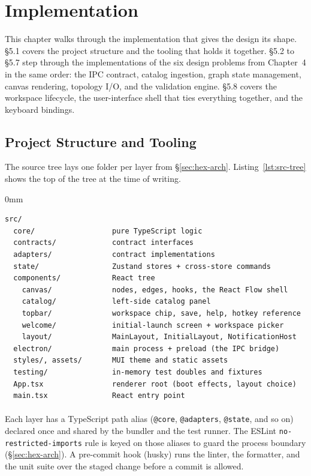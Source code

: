 \clearpage
\section{Implementation}

This chapter walks through the implementation that gives the design its shape. \S5.1 covers the project structure and the tooling that holds it together. \S5.2 to \S5.7 step through the implementations of the six design problems from Chapter~4 in the same order: the IPC contract, catalog ingestion, graph state management, canvas rendering, topology I/O, and the validation engine. \S5.8 covers the workspace lifecycle, the user-interface shell that ties everything together, and the keyboard bindings.

\subsection{Project Structure and Tooling}
\label{sec:project-structure}

The source tree lays one folder per layer from \S\ref{sec:hex-arch}. Listing~\ref{lst:src-tree} shows the top of the tree at the time of writing.

\begin{addmargin}[0mm]{0mm}
\begin{lstlisting}[caption={Top-level layout of \texttt{diff-forge/src/}.}, label=lst:src-tree, aboveskip=10pt]
src/
  core/                  pure TypeScript logic
  contracts/             contract interfaces
  adapters/              contract implementations
  state/                 Zustand stores + cross-store commands
  components/            React tree
    canvas/              nodes, edges, hooks, the React Flow shell
    catalog/             left-side catalog panel
    topbar/              workspace chip, save, help, hotkey reference
    welcome/             initial-launch screen + workspace picker
    layout/              MainLayout, InitialLayout, NotificationHost
  electron/              main process + preload (the IPC bridge)
  styles/, assets/       MUI theme and static assets
  testing/               in-memory test doubles and fixtures
  App.tsx                renderer root (boot effects, layout choice)
  main.tsx               React entry point
\end{lstlisting}
\end{addmargin}

\paragraph{}
Each layer has a TypeScript path alias (\texttt{@core}, \texttt{@adapters}, \texttt{@state}, and so on) declared once and shared by the bundler and the test runner. The ESLint \texttt{no-restricted-imports} rule is keyed on those aliases to guard the process boundary (\S\ref{sec:hex-arch}). A pre-commit hook (husky) runs the linter, the formatter, and the unit suite over the staged change before a commit is allowed.

